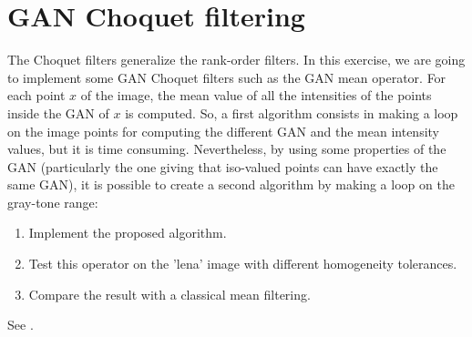 \section{GAN Choquet filtering}
The Choquet filters generalize the rank-order filters.
In this exercise, we are going to implement some GAN Choquet filters such as the GAN mean operator. For each point $x$ of the image, the mean value of all the intensities of the points inside the GAN of $x$ is computed. So, a first algorithm consists in making a loop on the image points for computing the different GAN and the mean intensity values, but it is time consuming. Nevertheless, by using some properties of the GAN (particularly the one giving that iso-valued points can have exactly the same GAN), it is possible to create a second algorithm by making a loop on the gray-tone range:

{\SetCustomAlgoRuledWidth{0pt}
\begin{algorithm}[htbp]
\SetAlgoLined
{}
\end{algorithm}
}

\begin{qbox}
\begin{enumerate}
	\item Implement the proposed algorithm.
	\item Test this operator on the 'lena' image with different homogeneity tolerances.
	\item Compare the result with a classical mean filtering.
\end{enumerate}
\end{qbox}

\begin{mcomment}
\begin{mremark}
 See .
\end{mremark}
\end{mcomment}

